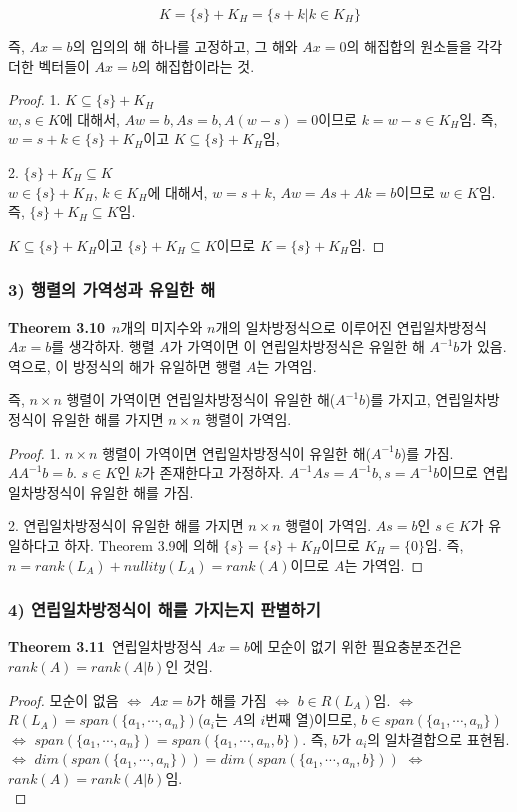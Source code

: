 \[
K=\{s\}+K_H=\{s+k | k \in K_H\}
\]

즉, $Ax=b$의 임의의 해 하나를 고정하고, 그 해와 $Ax=0$의 해집합의 원소들을 각각 더한 벡터들이 $Ax=b$의 해집합이라는 것.

\begin{proof}
1. $K \subseteq \{s\}+K_H$\\
$w,s \in K$에 대해서, $Aw=b,As=b,A(w-s)=0$이므로 $k=w-s \in K_H$임. 즉, $w=s+k \in \{s\}+K_H$이고 $K \subseteq \{s\}+K_H$임,

2. $\{s\}+K_H \subseteq K$\\
$w \in \{s\}+K_H$, $k \in K_H$에 대해서, $w=s+k$, $Aw=As+Ak=b$이므로 $w \in K$임. 즉, $\{s\}+K_H \subseteq K$임.

$K \subseteq \{s\}+K_H$이고 $\{s\}+K_H \subseteq K$이므로  $K=\{s\}+K_H$임.
\end{proof}

\subsubsection*{3) 행렬의 가역성과 유일한 해}
\textbf{Theorem 3.10}\, $n$개의 미지수와 $n$개의 일차방정식으로 이루어진 연립일차방정식 $Ax=b$를 생각하자. 행렬 $A$가 가역이면 이 연립일차방정식은 유일한 해 $A^{-1}b$가 있음. 역으로, 이 방정식의 해가 유일하면 행렬 $A$는 가역임.

즉, $n \times n$ 행렬이 가역이면 연립일차방정식이 유일한 해($A^{-1}b$)를 가지고, 연립일차방정식이 유일한 해를 가지면 $n \times n$ 행렬이 가역임.

\begin{proof}
1. $n \times n$ 행렬이 가역이면 연립일차방정식이 유일한 해($A^{-1}b$)를 가짐.
$AA^{-1}b=b$. $s \in K$인 $k$가 존재한다고 가정하자. $A^{-1}As=A^{-1}b,s=A^{-1}b$이므로 연립일차방정식이 유일한 해를 가짐.

2. 연립일차방정식이 유일한 해를 가지면 $n \times n$ 행렬이 가역임.
$As=b$인 $s \in K$가 유일하다고 하자. Theorem 3.9에 의해 $\{s\}=\{s\}+K_H$이므로 $K_H=\{0\}$임. 즉, $n=rank(L_A)+nullity(L_A)=rank(A)$이므로 $A$는 가역임.
\end{proof}

\subsubsection*{4) 연립일차방정식이 해를 가지는지 판별하기}
\textbf{Theorem 3.11}\, 연립일차방정식 $Ax=b$에 모순이 없기 위한 필요충분조건은 $rank(A)=rank(A|b)$인 것임.

\begin{proof}
모순이 없음 $\Leftrightarrow$ $Ax=b$가 해를 가짐 $\Leftrightarrow$ $b \in R(L_A)$임. $\Leftrightarrow$ $R(L_A)=span(\{a_1, \cdots ,a_n\})$($a_i$는 $A$의 $i$번째 열)이므로, $b \in span(\{a_1, \cdots ,a_n\})$ $\Leftrightarrow$ $span(\{a_1, \cdots ,a_n\})=span(\{a_1, \cdots ,a_n,b\})$. 즉, $b$가 $a_i$의 일차결합으로 표현됨. $\Leftrightarrow$ $dim(span(\{a_1, \cdots ,a_n\}))=dim(span(\{a_1, \cdots ,a_n,b\}))$ $\Leftrightarrow$ $rank(A)=rank(A|b)$임.\\
\end{proof}


